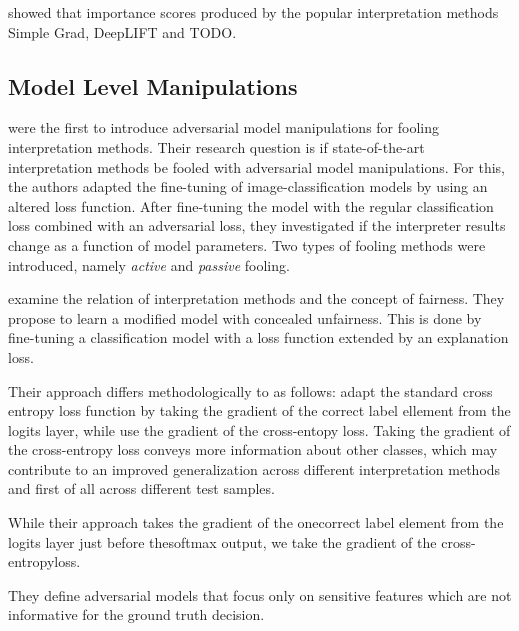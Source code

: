 \cite{ghorbani2019interpretation} showed that importance scores produced by the popular interpretation methods Simple Grad, DeepLIFT and TODO. 



\subsection{Model Level Manipulations}

\cite{fooling_nn_interpreters} were the first to introduce adversarial model manipulations for fooling interpretation methods. 
Their research question is if state-of-the-art interpretation methods be fooled with adversarial model manipulations. For this, the authors adapted the fine-tuning of image-classification models by using an altered loss function. 
After fine-tuning the model with the regular classification loss combined with an adversarial loss, they investigated if the interpreter results change as a function of model parameters. 
Two types of fooling methods were introduced, namely \textit{active} and \textit{passive} fooling. 


\mypar{}
\cite{dimanov2020you} examine the relation of interpretation methods and the concept of fairness. They propose to learn a modified model with concealed unfairness. This is done by fine-tuning a classification model with a loss function extended by an explanation loss. 

Their approach differs methodologically to \cite{fooling_nn_interpreters} as follows: 
\cite{fooling_nn_interpreters} adapt the standard cross entropy loss function by taking the gradient of the correct label ellement from the logits layer, while \cite{dimanov2020you} use the gradient of the cross-entopy loss. 
Taking the gradient of the cross-entropy loss conveys more information about other classes, which may contribute to an improved generalization across different interpretation methods and first of all across different test samples. 

While their approach takes the gradient of the onecorrect label element from the logits layer just before thesoftmax output, we take the gradient of the cross-entropyloss. 

They define adversarial models that focus only on sensitive features which are not informative for the ground truth decision. 


